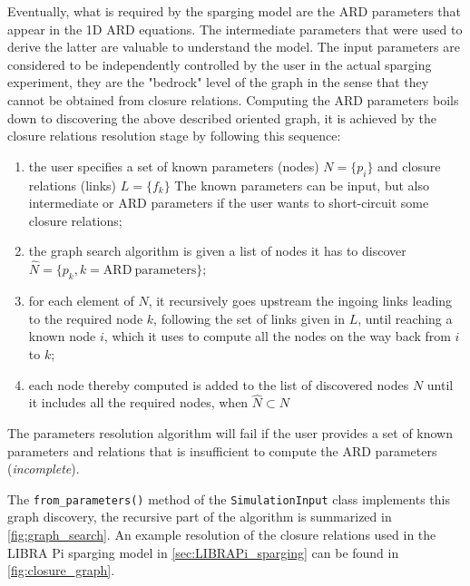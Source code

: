 \documentclass[a4paper,11pt,oneside]{report}
\begin{document}
Eventually, what is required by the sparging model are the ARD parameters that appear in the 1D ARD equations. The intermediate parameters that were used to derive the latter are valuable to understand the model. The input parameters are considered to be independently controlled by the user in the actual sparging experiment, they are the "bedrock" level of the graph in the sense that they cannot be obtained from closure relations. Computing the ARD parameters boils down to discovering the above described oriented graph, it is achieved by the closure relations resolution stage by following this sequence:
\begin{enumerate}
    \item the user specifies a set of known parameters (nodes) $N=\{p_i\}$ and closure relations (links) $L=\{f_k\}$ The known parameters can be input, but also intermediate or ARD parameters if the user wants to short-circuit some closure relations;
    \item the graph search algorithm is given a list of nodes it has to discover $\hat N=\{p_k, k=\mathrm{ARD \ parameters}\}$;
    \item for each element of $\hat N$, it recursively goes upstream the ingoing links leading to the required node $k$, following the set of links given in $L$, until reaching a known node $i$, which it uses to compute all the nodes on the way back from $i$ to $k$;
    \item each node thereby computed is added to the list of discovered nodes $N$ until it includes all the required nodes, when $\hat N \subset N$
\end{enumerate}
The parameters resolution algorithm will fail if the user provides a set of known parameters and relations that is insufficient to compute the ARD parameters (\textit{incomplete}). 

The \verb|from_parameters()| method of the \verb|SimulationInput| class implements this graph discovery, the recursive part of the algorithm is summarized in \cref{fig:graph_search}. An example resolution of the closure relations used in the LIBRA Pi sparging model in \cref{sec:LIBRAPi_sparging} can be found in \cref{fig:closure_graph}. 





\end{document}
